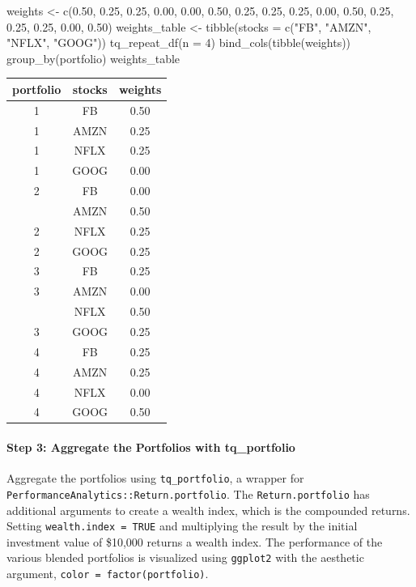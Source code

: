 \begin{Schunk}
\begin{Sinput}
weights <- c(0.50, 0.25, 0.25, 0.00,
             0.00, 0.50, 0.25, 0.25,
             0.25, 0.00, 0.50, 0.25, 
             0.25, 0.25, 0.00, 0.50)
weights_table <- tibble(stocks = c("FB", "AMZN", "NFLX", "GOOG")) %
    tq_repeat_df(n = 4) %
    bind_cols(tibble(weights)) %
    group_by(portfolio)
weights_table
\end{Sinput}
\end{Schunk}

\begin{tabular}{ccc}
\toprule
portfolio & stocks & weights\\
\midrule
1 & FB & 0.50\\
1 & AMZN & 0.25\\
1 & NFLX & 0.25\\
1 & GOOG & 0.00\\
2 & FB & 0.00\\
\addlinespace
2 & AMZN & 0.50\\
2 & NFLX & 0.25\\
2 & GOOG & 0.25\\
3 & FB & 0.25\\
3 & AMZN & 0.00\\
\addlinespace
3 & NFLX & 0.50\\
3 & GOOG & 0.25\\
4 & FB & 0.25\\
4 & AMZN & 0.25\\
4 & NFLX & 0.00\\
4 & GOOG & 0.50\\
\bottomrule
\end{tabular}

\hspace{20 mm}

\paragraph{Step 3: Aggregate the Portfolios with
tq\_portfolio}\label{step-3-aggregate-the-portfolios-with-tq_portfolio}

Aggregate the portfolios using \texttt{tq\_portfolio}, a wrapper for
\texttt{PerformanceAnalytics::Return.portfolio}. The
\texttt{Return.portfolio} has additional arguments to create a wealth
index, which is the compounded returns. Setting
\texttt{wealth.index\ =\ TRUE} and multiplying the result by the initial
investment value of \$10,000 returns a wealth index. The performance of
the various blended portfolios is visualized using \texttt{ggplot2} with
the aesthetic argument, \texttt{color\ =\ factor(portfolio)}.

